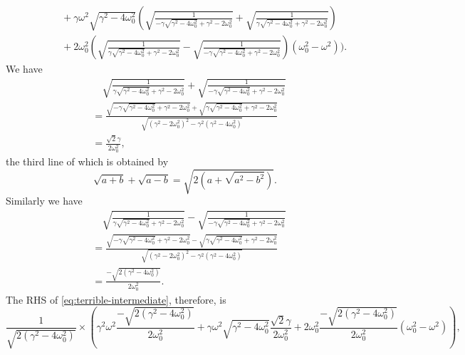 \documentclass[hyperref, a4paper]{article}
\begin{document}
\begin{itemize}
\begin{equation}
\begin{aligned}
            &\quad\quad\quad +\gamma  \omega ^2 \sqrt{\gamma ^2-4 \omega_0^2} \left(\sqrt{\frac{1}{-\gamma  \sqrt{\gamma ^2-4 \omega_0^2}+\gamma ^2-2 \omega_0^2}}+\sqrt{\frac{1}{\gamma  \sqrt{\gamma ^2-4 \omega_0^2}+\gamma ^2-2 \omega_0^2}}\right) \\
            &\quad\quad \quad +2 \omega_0^2 \left(\sqrt{\frac{1}{\gamma  \sqrt{\gamma ^2-4 \omega_0^2}+\gamma ^2-2 \omega_0^2}}-\sqrt{\frac{1}{-\gamma  \sqrt{\gamma ^2-4 \omega_0^2}+\gamma ^2-2 \omega_0^2}}\right) \left(\omega_0^2-\omega^2\right) \Biggr) .
        \end{aligned}
        \label{eq:terrible-intermediate}
    \end{equation}
    We have
    \[
        \begin{aligned}
            &\quad \sqrt{\frac{1}{\gamma  \sqrt{\gamma ^2-4 \omega_0^2}+\gamma ^2-2 \omega_0^2}}+\sqrt{\frac{1}{-\gamma  \sqrt{\gamma ^2-4 \omega_0^2}+\gamma ^2-2 \omega_0^2}} \\
            &= \frac{\sqrt{-\gamma  \sqrt{\gamma ^2-4 \omega_0^2}+\gamma ^2-2 \omega_0^2} + \sqrt{\gamma  \sqrt{\gamma ^2-4 \omega_0^2}+\gamma ^2-2 \omega_0^2}}{\sqrt{ (\gamma^2 - 2 \omega_0^2)^2 - \gamma^2(\gamma^2 - 4 \omega_0^2) }} \\
            &= \frac{\sqrt{2} \gamma}{2 \omega_0^2},
        \end{aligned}
    \]
    the third line of which is obtained by 
    \[
        \sqrt{a + b} + \sqrt{a - b} = \sqrt{2 (a + \sqrt{a^2 - b^2})}.
    \]
    Similarly we have 
    \[
        \begin{aligned}
            &\quad \sqrt{\frac{1}{\gamma  \sqrt{\gamma ^2-4 \omega_0^2}+\gamma ^2-2 \omega_0^2}}-\sqrt{\frac{1}{-\gamma  \sqrt{\gamma ^2-4 \omega_0^2}+\gamma ^2-2 \omega_0^2}} \\
            &= \frac{\sqrt{-\gamma  \sqrt{\gamma ^2-4 \omega_0^2}+\gamma ^2-2 \omega_0^2} - \sqrt{\gamma  \sqrt{\gamma ^2-4 \omega_0^2}+\gamma ^2-2 \omega_0^2}}{\sqrt{ (\gamma^2 - 2 \omega_0^2)^2 - \gamma^2(\gamma^2 - 4 \omega_0^2) }} \\
            &= \frac{- \sqrt{2 (\gamma^2 - 4 \omega_0^2)}}{2 \omega_0^2}.
        \end{aligned}
    \]
    The RHS of \eqref{eq:terrible-intermediate}, therefore, is 
    \[
        \frac{1}{\sqrt{2(\gamma^2 - 4 \omega_0^2)}} \times \left( \gamma^2 \omega^2 \frac{- \sqrt{2 (\gamma^2 - 4 \omega_0^2)}}{2 \omega_0^2} + \gamma \omega^2 \sqrt{\gamma^2 - 4 \omega_0^2} \frac{\sqrt{2} \gamma}{2 \omega_0^2} + 2\omega_0^2 \frac{- \sqrt{2 (\gamma^2 - 4 \omega_0^2)}}{2 \omega_0^2} (\omega_0^2 - \omega^2) \right),
\]
\end{itemize}
\end{document}
